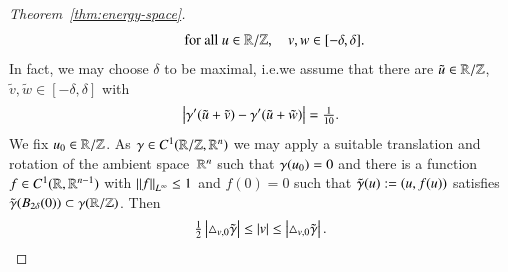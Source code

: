 \begin{proof}[Theorem~\ref{thm:energy-space}]
\begin{equation}
 \qquad \text{for all } u\in\R/\Z, \quad v,w\in[-\delta,\delta].
\end{equation}
In fact, we may choose $\delta$ to be maximal, i.e.\@ we
assume that there are $\tilde u\in\R/\Z$, $\tilde v,\tilde w\in[-\delta,\delta]$
with
\begin{equation}\label{eq:delta=max}
 \abs{\dg(\tilde u+\tilde v)-\dg(\tilde u+\tilde w)} = \tfrac1{10}.
\end{equation}
We fix $u_{0}\in\R/\Z$. As $\g\in C^{1}\rzd$ we may apply a suitable
translation and rotation of the ambient space~$\R^{n}$ such that
$\g(u_{0})=0$ and there is a function $f\in C^{1}(\R,\R^{n-1})$
with $\lnorm[\infty]f\le1$ and $f(0)=0$ such that
$\tilde\g(u):=(u,f(u))$ satisfies $\tilde\g(B_{2\delta}(0))\subset \g(\R/\Z)$.
Then
\begin{equation}\label{eq:tilde-bilip}
 \tfrac12\abs{\T[\tilde\g]v0}\le\abs{v}\le\abs{\T[\tilde\g]v0}.
\end{equation}


\end{proof}
